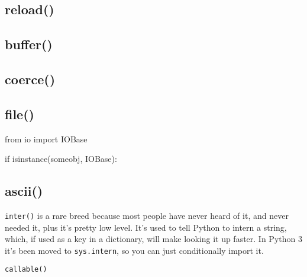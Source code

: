 \subsection{reload()}

\subsection{buffer()}

\subsection{coerce()}

\subsection{file()}

\begin{py2}
from io import IOBase

if isinstance(someobj, IOBase):
\end{py2}

\subsection{ascii()}

\lstinline{inter()} is a rare breed because most people have never heard of it, and never needed it, plus it's pretty low level. It's used to tell Python to intern a string, which, if used as a key in a dictionary, will make looking it up faster. In Python 3 it's been moved to \lstinline{sys.intern}, so you can just conditionally import it.

\lstinline{callable()}

